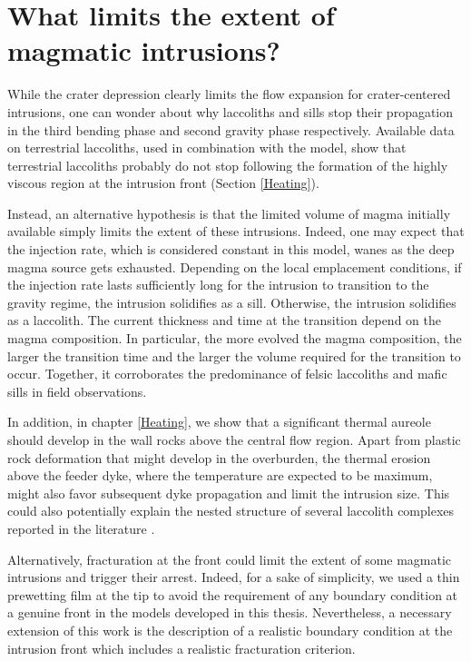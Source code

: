 \section{What limits the extent of magmatic intrusions?}
\label{sec:summary-2}

While  the crater  depression clearly  limits the  flow expansion  for
crater-centered intrusions,  one can  wonder about why  laccoliths and
sills stop  their propagation  in the third  bending phase  and second
gravity phase respectively. Available  data on terrestrial laccoliths,
used in combination  with the model, show  that terrestrial laccoliths
probably do  not stop  following the formation  of the  highly viscous
region at the intrusion front (Section \ref{Heating}).

Instead, an alternative hypothesis is that the limited volume of magma
initially   available    simply   limits    the   extent    of   these
intrusions. Indeed, one  may expect that the injection  rate, which is
considered constant in this model, wanes as the deep magma source gets
exhausted.   Depending on  the  local emplacement  conditions, if  the
injection rate lasts sufficiently long for the intrusion to transition
to the gravity regime, the intrusion solidifies as a sill.  Otherwise,
the intrusion  solidifies as a  laccolith.  The current  thickness and
time  at  the   transition  depend  on  the   magma  composition.   In
particular, the  more evolved  the magma  composition, the  larger the
transition time and the larger  the volume required for the transition
to  occur.   Together,  it  corroborates the  predominance  of  felsic
laccoliths and mafic sills in field observations.

In  addition, in  chapter \ref{Heating},  we show  that a  significant
thermal aureole  should develop  in the wall  rocks above  the central
flow region. Apart from plastic rock deformation that might develop in
the overburden, the  thermal erosion above the feeder  dyke, where the
temperature are  expected to be  maximum, might also  favor subsequent
dyke  propagation  and  limit  the intrusion  size.  This  could  also
potentially  explain   the  nested  structure  of   several  laccolith
complexes reported in the literature \citep{E:2015tl,Rocchi:2010dn}.

Alternatively, fracturation  at the  front could  limit the  extent of
some magmatic intrusions and trigger  their arrest. Indeed, for a sake
of simplicity, we used a thin prewetting  film at the tip to avoid the
requirement of any boundary condition at a genuine front in the models
developed in this thesis.  Nevertheless, a necessary extension of this
work  is the  description of  a  realistic boundary  condition at  the
intrusion front which includes a realistic fracturation criterion.

